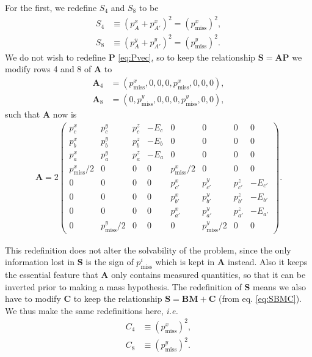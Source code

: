 \documentclass[twoside,english]{uiofysmaster}
\begin{document}
For the first, we redefine $S_4$ and $S_8$ to be 
\begin{align}
	S_4 &\equiv (p_A^x + p_{A'}^x)^2 = (p_\mathrm{miss}^x)^2, \label{eq:Svec_modified} \\
	S_8 &\equiv (p_A^y + p_{A'}^y)^2 = (p_\mathrm{miss}^y)^2. \nonumber
\end{align}
We do not wish to redefine $\mathbf{P}$ \eqref{eq:Pvec}, so to keep the relationship $\mathbf{S} = \mathbf{A}\mathbf{P}$ we modify rows 4 and 8 of $\mathbf{A}$ to
\begin{align}
	\mathbf{A}_4 &= (p_\mathrm{miss}^x, 0, 0, 0, p_\mathrm{miss}^x, 0, 0, 0),\\
	\mathbf{A}_8 &= (0, p_\mathrm{miss}^y, 0, 0, 0, p_\mathrm{miss}^y, 0, 0),\nonumber
\end{align}
such that $\mathbf{A}$ now is
\begin{align}
	\mathbf{A} = 2 \begin{pmatrix}
						p_c^x & p_c^y & p_c^z & -E_c & 0 & 0 & 0 & 0 \\
						p_b^x & p_b^y & p_b^z & -E_b & 0 & 0 & 0 & 0 \\
						p_a^x & p_a^y & p_a^z & -E_a & 0 & 0 & 0 & 0 \\
						p_\mathrm{miss}^x/2 & 0 & 0 & 0 & p_\mathrm{miss}^x/2 & 0 & 0 & 0\\
						0 & 0 & 0 & 0 & p_{c'}^x & p_{c'}^y & p_{c'}^z & -E_{c'} \\
						0 & 0 & 0 & 0 & p_{b'}^x & p_{b'}^y & p_{b'}^z & -E_{b'} \\
						0 & 0 & 0 & 0 & p_{a'}^x & p_{a'}^y & p_{a'}^z & -E_{a'} \\
						0 & p_\mathrm{miss}^y/2 & 0 & 0 & 0 & p_\mathrm{miss}^y/2 & 0 & 0
					\end{pmatrix}. \label{eq:Amatrix_modified}
\end{align}

This redefinition does not alter the solvability of the problem, since the only information lost in $\mathbf{S}$ is the sign of $p_\mathrm{miss}^i$ which is kept in $\mathbf{A}$ instead. Also it keeps the essential feature that $\mathbf{A}$ only contains measured quantities, so that it can be inverted prior to making a mass hypothesis. The redefinition of $\mathbf{S}$ means we also have to modify $\mathbf{C}$ to keep the relationship $\mathbf{S} = \mathbf{B} \mathbf{M} + \mathbf{C}$ (from eq. \eqref{eq:SBMC}). We thus make the same redefinitions here, {\it i.e.}
\begin{align}
	C_4 &\equiv (p_\mathrm{miss}^x)^2, \label{eq:Cvec_modified} \\
	C_8 &\equiv (p_\mathrm{miss}^y)^2. \nonumber
\end{align}
\end{document}
